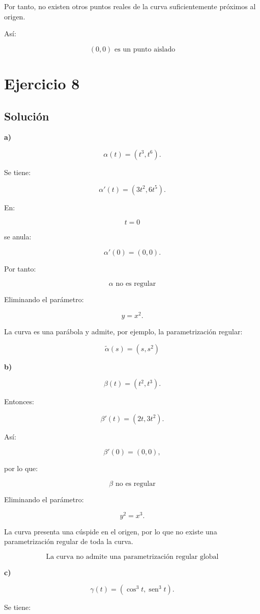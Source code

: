 \documentclass[11pt,a4paper]{article}
\newcommand{\sen}{\operatorname{sen}}
\begin{document}
Por tanto, no existen otros puntos reales de la curva suficientemente próximos al origen.

Así:

\[
\boxed{
(0,0)\text{ es un punto aislado}
}
\]

\section{Ejercicio 8}
\subsection{Solución}

\textbf{a)}

\[
\alpha(t)=(t^3,t^6).
\]

Se tiene:

\[
\alpha'(t)
=
(3t^2,6t^5).
\]

En:

\[
t=0
\]

se anula:

\[
\alpha'(0)=(0,0).
\]

Por tanto:

\[
\boxed{
\alpha\text{ no es regular}
}
\]

Eliminando el parámetro:

\[
y=x^2.
\]

La curva es una parábola y admite, por ejemplo, la parametrización regular:

\[
\boxed{
\widetilde\alpha(s)=(s,s^2)
}
\]

\textbf{b)}

\[
\beta(t)=(t^2,t^3).
\]

Entonces:

\[
\beta'(t)
=
(2t,3t^2).
\]

Así:

\[
\beta'(0)=(0,0),
\]

por lo que:

\[
\boxed{
\beta\text{ no es regular}
}
\]

Eliminando el parámetro:

\[
y^2=x^3.
\]

La curva presenta una cúspide en el origen, por lo que no existe una parametrización regular de toda la curva.

\[
\boxed{
\text{La curva no admite una parametrización regular global}
}
\]

\textbf{c)}

\[
\gamma(t)
=
(\cos^3t,\sen^3t).
\]

Se tiene:
\end{document}
